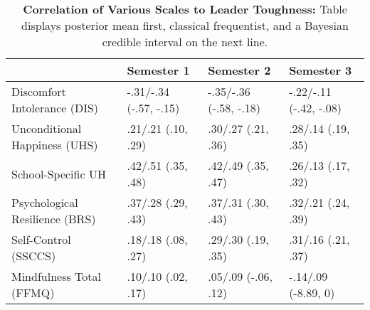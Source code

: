 \begin{table}[ht]
\centering
\begin{tabular}{llll}
  \hline
 & Semester 1 & Semester 2 & Semester 3 \\ 
  \hline
Discomfort Intolerance (DIS) & -.31/-.34 (-.57, -.15) & -.35/-.36 (-.58, -.18) & -.22/-.11 (-.42, -.08) \\ 
  Unconditional Happiness (UHS) & .21/.21 (.10, .29) & .30/.27 (.21, .36) & .28/.14 (.19, .35) \\ 
  School-Specific UH & .42/.51 (.35, .48) & .42/.49 (.35, .47) & .26/.13 (.17, .32) \\ 
  Psychological Resilience (BRS) & .37/.28 (.29, .43) & .37/.31 (.30, .43) & .32/.21 (.24, .39) \\ 
  Self-Control (SSCCS) & .18/.18 (.08, .27) & .29/.30 (.19, .35) & .31/.16 (.21, .37) \\ 
  Mindfulness Total (FFMQ) & .10/.10 (.02, .17) & .05/.09 (-.06, .12) & -.14/.09 (-8.89, 0) \\ 
   \hline
\end{tabular}
\caption{\textbf{Correlation of Various Scales to Leader Toughness:} Table displays posterior mean first, classical frequentist, and a Bayesian credible interval on the next line.} 
\label{tab:edc_corr}
\end{table}
